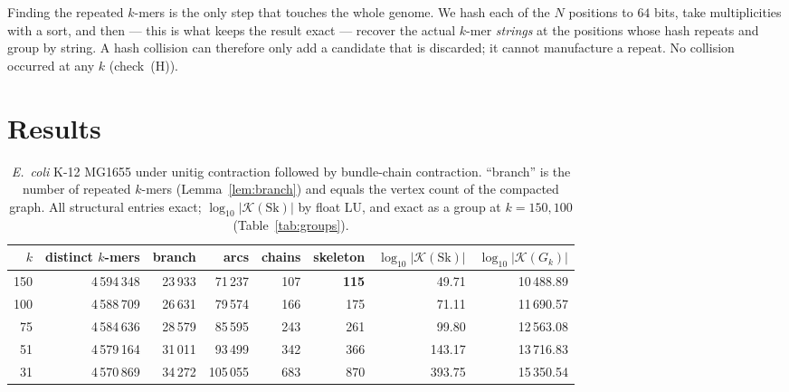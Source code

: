 \documentclass[11pt]{article}
\theoremstyle{plain}
\theoremstyle{definition}
\theoremstyle{remark}
\newcommand{\K}{\mathcal{K}}
\newcommand{\Sk}{\mathrm{Sk}}
\begin{document}
Finding the repeated $k$-mers is the only step that touches the whole genome. We hash
each of the $N$ positions to $64$ bits, take multiplicities with a sort, and then --- this
is what keeps the result exact --- recover the actual $k$-mer \emph{strings} at the
positions whose hash repeats and group by string. A hash collision can therefore only
add a candidate that is discarded; it cannot manufacture a repeat. No collision occurred
at any $k$ (check~(H)).

\section{Results}\label{sec:results}

\begin{table}[ht]
\centering\footnotesize
\begin{tabular}{rrrrrrrr}
\toprule
$k$ & distinct $k$-mers & branch & arcs & chains & skeleton
& $\log_{10}|\K(\Sk)|$ & $\log_{10}|\K(G_k)|$\\
\midrule
150 & 4\,594\,348 & 23\,933 & 71\,237 & 107 & \textbf{115} & 49.71 & 10\,488.89\\
100 & 4\,588\,709 & 26\,631 & 79\,574 & 166 & 175 & 71.11 & 11\,690.57\\
 75 & 4\,584\,636 & 28\,579 & 85\,595 & 243 & 261 & 99.80 & 12\,563.08\\
 51 & 4\,579\,164 & 31\,011 & 93\,499 & 342 & 366 & 143.17 & 13\,716.83\\
 31 & 4\,570\,869 & 34\,272 & 105\,055 & 683 & 870 & 393.75 & 15\,350.54\\
\bottomrule
\end{tabular}
\caption{\emph{E.\ coli} K-12 MG1655 under unitig contraction followed by bundle-chain
contraction. ``branch'' is the number of repeated $k$-mers (Lemma~\ref{lem:branch}) and
equals the vertex count of the compacted graph. All structural entries exact;
$\log_{10}|\K(\Sk)|$ by float LU, and exact as a group at $k=150,100$
(Table~\ref{tab:groups}).}
\label{tab:main}
\end{table}
\end{document}

